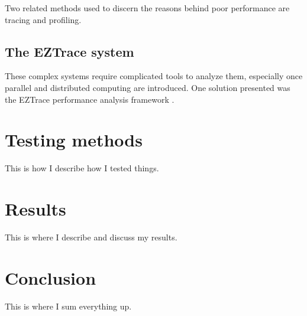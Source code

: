 \documentclass[12pt]{article}
\begin{document}
Two related methods used to discern the reasons behind poor performance are tracing and profiling. 

\subsection{The EZTrace system}

These complex systems require complicated tools to analyze them, especially once parallel and distributed computing are 
introduced. One solution presented was the EZTrace performance analysis framework \cite{Trahay2011}.

\section{Testing methods}

This is how I describe how I tested things.

\section{Results}

This is where I describe and discuss my results.

\section{Conclusion}

This is where I sum everything up.



\end{document}

